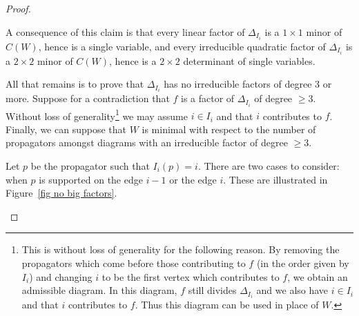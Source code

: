 \documentclass[11pt]{article}
\theoremstyle{remark}
\theoremstyle{definition}
\begin{document}
\begin{proof}
\begin{enumerate}
A consequence of this claim is that every linear factor of $\Delta_{I_i}$ is a $1\times 1$ minor of $C(W)$, hence is a single variable, and every irreducible quadratic factor of $\Delta_{I_i}$ is a $2\times 2$ minor of $C(W)$, hence is a $2\times 2$ determinant of single variables.

All that remains is to prove that $\Delta_{I_i}$ has no irreducible factors of degree 3 or more.  Suppose for a contradiction that $f$ is a factor of $\Delta_{I_i}$ of degree $\geq 3$. Without loss of generality\footnote{This is without loss of generality for the following reason.  By removing the propagators which come before those contributing to $f$ (in the order given by $I_i$) and changing $i$ to be the first vertex which contributes to $f$, we obtain an admissible diagram.  In this diagram, $f$ still divides $\Delta_{I_i}$ and we also have $i\in I_i$ and that 
$i$ contributes to $f$.  Thus this diagram can be used in place of $W$.} we may assume $i\in I_i$ and that $i$ contributes to $f$.
Finally, we can suppose that $W$ is minimal with respect to the number of propagators amongst diagrams with an irreducible factor of degree $\geq 3$. 

Let $p$ be the propagator such that $I_i(p) = i$. There are two cases to consider: when $p$ is supported on the edge $i-1$ or the edge $i$.  These are illustrated in Figure~\ref{fig no big factors}.





\end{enumerate}
\end{proof}
\end{document}
